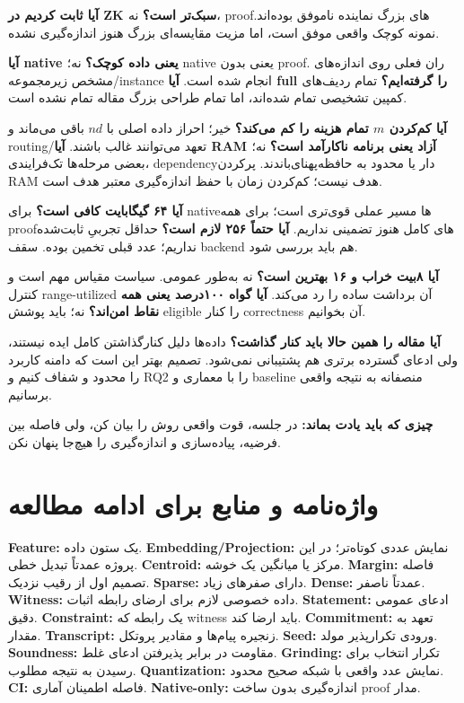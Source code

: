 \documentclass[11pt,a4paper]{article}
\newcommand{\lesson}[1]{\clearpage\section{#1}}
\newcommand{\takeaway}[1]{\par\textbf{چیزی که باید یادت بماند:} #1\par}
\begin{document}
\textbf{آیا ثابت کردیم در ZK سبک‌تر است؟} نه، proofهای بزرگ نماینده ناموفق بوده‌اند. نمونه کوچک واقعی موفق است، اما مزیت مقایسه‌ای بزرگ هنوز اندازه‌گیری نشده.

\textbf{آیا native یعنی داده کوچک؟} نه؛ native یعنی بدون proof. ران فعلی روی اندازه‌های مشخص زیرمجموعه/instance انجام شده است. \textbf{آیا full را گرفته‌ایم؟} تمام ردیف‌های کمپین تشخیصی تمام شده‌اند، اما تمام طراحی بزرگ مقاله تمام نشده است.

\textbf{آیا کم‌کردن \(m\) تمام هزینه را کم می‌کند؟} خیر؛ احراز داده اصلی با \(nd\) باقی می‌ماند و routing/تعهد می‌توانند غالب باشند. \textbf{آیا RAM آزاد یعنی برنامه ناکارآمد است؟} نه؛ بعضی مرحله‌ها تک‌فرایندی، dependencyدار یا محدود به حافظه‌پهنای‌باندند. پرکردن RAM هدف نیست؛ کم‌کردن زمان با حفظ اندازه‌گیری معتبر هدف است.

\textbf{آیا ۶۴ گیگابایت کافی است؟} برای nativeها مسیر عملی قوی‌تری است؛ برای همه proofهای کامل هنوز تضمینی نداریم. \textbf{آیا حتماً ۲۵۶ لازم است؟} حداقل تجربیِ ثابت‌شده نداریم؛ عدد قبلی تخمین بوده. سقف backend هم باید بررسی شود.

\textbf{آیا ۸بیت خراب و ۱۶ بهترین است؟} نه به‌طور عمومی. سیاست مقیاس مهم است و کنترل range-utilized آن برداشت ساده را رد می‌کند. \textbf{آیا گواه ۱۰۰درصد یعنی همه نقاط امن‌اند؟} نه؛ باید پوشش eligible را کنار correctness آن بخوانیم.

\textbf{آیا مقاله را همین حالا باید کنار گذاشت؟} داده‌ها دلیل کنارگذاشتن کامل ایده نیستند، ولی ادعای گسترده برتری هم پشتیبانی نمی‌شود. تصمیم بهتر این است که دامنه کاربرد را محدود و شفاف کنیم و RQ2 را با معماری و baseline منصفانه به نتیجه واقعی برسانیم.

\takeaway{در جلسه، قوت واقعی روش را بیان کن، ولی فاصله بین فرضیه، پیاده‌سازی و اندازه‌گیری را هیچ‌جا پنهان نکن.}

\lesson{واژه‌نامه و منابع برای ادامه مطالعه}
\textbf{Feature:} یک ستون داده. \textbf{Embedding/Projection:} نمایش عددی کوتاه‌تر؛ در این پروژه عمدتاً تبدیل خطی. \textbf{Centroid:} مرکز یا میانگین یک خوشه. \textbf{Margin:} فاصله تصمیم اول از رقیب نزدیک. \textbf{Sparse:} دارای صفرهای زیاد. \textbf{Dense:} عمدتاً ناصفر. \textbf{Witness:} داده خصوصی لازم برای ارضای رابطه اثبات. \textbf{Statement:} ادعای عمومی دقیق. \textbf{Constraint:} یک رابطه که witness باید ارضا کند. \textbf{Commitment:} تعهد به مقدار. \textbf{Transcript:} زنجیره پیام‌ها و مقادیر پروتکل. \textbf{Seed:} ورودی تکرارپذیر مولد. \textbf{Soundness:} مقاومت در برابر پذیرفتن ادعای غلط. \textbf{Grinding:} تکرار انتخاب برای رسیدن به نتیجه مطلوب. \textbf{Quantization:} نمایش عدد واقعی با شبکه صحیح محدود. \textbf{CI:} فاصله اطمینان آماری. \textbf{Native-only:} اندازه‌گیری بدون ساخت proof مدار.
\end{document}
